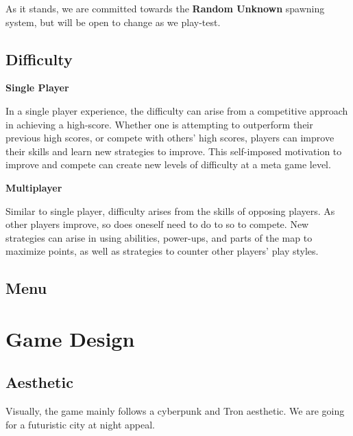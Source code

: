 \documentclass{article}
\theoremstyle{definition}
\begin{document}
As it stands, we are committed towards the \textbf{Random Unknown} spawning
system, but will be open to change as we play-test.

\subsection{Difficulty}

\textbf{Single Player}

In a single player experience, the difficulty can arise
from a competitive approach in achieving a high-score. Whether one is
attempting to outperform their previous high scores, or compete with others'
high scores, players can improve their skills and learn new strategies to
improve. This self-imposed motivation to improve and compete can create new
levels of difficulty at a meta game level.

\textbf{Multiplayer}

Similar to single player, difficulty arises from the skills of opposing
players. As other players improve, so does oneself need to do to so to compete.
New strategies can arise in using abilities, power-ups, and parts of the map to
maximize points, as well as strategies to counter other players' play styles.

\subsection{Menu}

\section{Game Design}

\subsection{Aesthetic}

Visually, the game mainly follows a cyberpunk and Tron aesthetic. We are going
for a futuristic city at night appeal.
\end{document}
